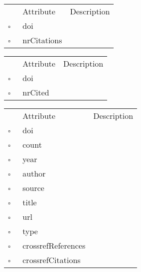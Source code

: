 \clearpage
\begin{table}
\caption{MissingCitedWork  }

\begin{longtable}{llp{8cm}}
& Attribute & Description \\
$\square$\ & doi &  \\
$\square$\ & nrCitations &  \\
\end{longtable}
\label{attr:MissingCitedWork}
\end{table}

\begin{table}
\caption{MissingCitingWork  }

\begin{longtable}{llp{8cm}}
& Attribute & Description \\
$\square$\ & doi &  \\
$\square$\ & nrCited &  \\
\end{longtable}
\label{attr:MissingCitingWork}
\end{table}

\begin{table}
\caption{MissingCross  }

\begin{longtable}{llp{8cm}}
& Attribute & Description \\
$\square$\ & doi &  \\
$\square$\ & count &  \\
$\square$\ & year &  \\
$\square$\ & author &  \\
$\square$\ & source &  \\
$\square$\ & title &  \\
$\square$\ & url &  \\
$\square$\ & type &  \\
$\square$\ & crossrefReferences &  \\
$\square$\ & crossrefCitations &  \\
\end{longtable}
\label{attr:MissingCross}
\end{table}


